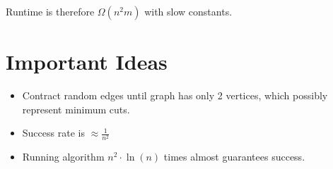 \documentclass[11pt]{article}
\begin{document}
		Runtime is therefore $\Omega(n^2 m)$ with slow constants.
		
\section*{Important Ideas}
	\begin{itemize}
		\item Contract random edges until graph has only 2 vertices, which possibly represent minimum cuts.
		\item Success rate is $\approx\frac{1}{n^2}$
		\item Running algorithm $n^2\cdot\ln (n)$ times almost guarantees success.
	\end{itemize}

%		
%		


\end{document}
